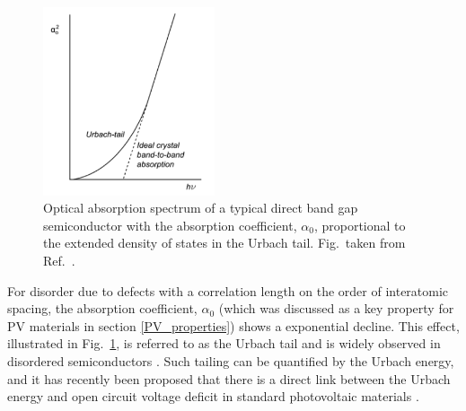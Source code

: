 \documentclass[11pt, twoside]{report}
\begin{document}
\begin{figure}[h!]
  \centering
    \includegraphics[width=0.45\textwidth]{figures/urbach_fig.png}
    \caption[Optical absorption spectrum of a typical direct band gap semiconductor with the absorption coefficient, $\alpha_{0}$, proportional to the extended density of states in the Urbach tail.]{Optical absorption spectrum of a typical direct band gap semiconductor with the absorption coefficient, $\alpha_{0}$, proportional to the extended density of states in the Urbach tail. Fig.~taken from Ref.~.}
  \label{urbach_fig}
\end{figure}
For disorder due to defects with a correlation length on the order of interatomic spacing, the absorption coefficient, $\alpha_{0}$ (which was discussed as a key property for PV materials in section \ref{PV_properties}) shows a exponential decline. This effect, illustrated in Fig.~\ref{urbach_fig}, is referred to as the Urbach tail \cite{Urbach1953} and is widely observed in disordered semiconductors \cite{thin_film_Boer}. Such tailing can be quantified by the Urbach energy, and it has recently been proposed that there is a direct link between the Urbach energy and open circuit voltage deficit in standard photovoltaic materials \cite{culprit, UrbachE_Voc}.
\end{document}
